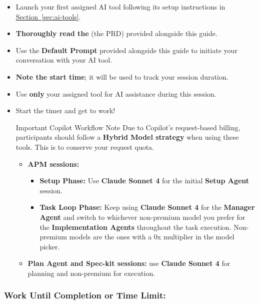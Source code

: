 \documentclass[11pt, a4paper]{article}
\newcommand{\inlinecode}[1]{%
    \raisebox{-0.2ex}{%
    \tcbox[
        enhanced,
        nobeforeafter,
        colback=codebackground,
        colframe=codebordercolor,
        coltext=codetextcolor,
        boxrule=0.5pt,
        arc=2pt,
        boxsep=0pt,
        left=0.8mm,
        right=0.8mm,
        top=0.3mm,
        bottom=0.3mm,
        fontupper=\ttfamily\small\color{codetextcolor}
    ]{#1}%
    }%
}
\begin{document}
    \begin{itemize}
        \item Launch your first assigned AI tool following its setup instructions in \hyperref[sec:ai-tools]{Section~\ref*{sec:ai-tools}}.
        \item \textbf{Thoroughly read the} \inlinecode{Specification.md} (the PRD) provided alongside this guide.
        \item Use the \textbf{Default Prompt} provided alongside this guide to initiate your conversation with your AI tool.
        \item \textbf{Note the start time}; it will be used to track your session duration.
        \item Use \textbf{only} your assigned tool for AI assistance during this session.
        \item Start the timer and get to work!
        \begin{mainbox}{Important Copilot Workflow Note}
            Due to Copilot's request-based billing, participants should follow a \textbf{Hybrid Model strategy} when using these tools. This is to conserve your request quota.
            \begin{itemize}
                \item \textbf{APM sessions:}
                \begin{itemize}
                    \item \textbf{Setup Phase:} Use \textbf{Claude Sonnet 4} for the initial \textbf{Setup Agent} session.
                    \item \textbf{Task Loop Phase:} Keep using \textbf{Claude Sonnet 4} for the \textbf{Manager Agent} and switch to whichever non-premium model you prefer for the \textbf{Implementation Agents} throughout the task execution. Non-premium models are the ones with a 0x multiplier in the model picker.
                \end{itemize}
                \vspace{0.5em}
                \item \textbf{Plan Agent and Spec-kit sessions:} use \textbf{Claude Sonnet 4} for planning and non-premium for execution.
            \end{itemize}
        \end{mainbox}
    \end{itemize}
        
\subsubsection*{Work Until Completion or Time Limit:}
    
\end{document}
